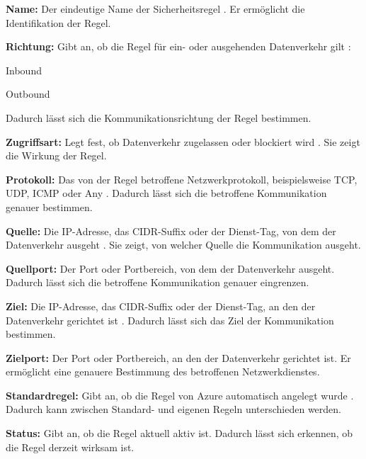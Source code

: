 \begin{compactitem}

    \item \textbf{Name:} Der eindeutige Name der Sicherheitsregel
    \cite{microsoft2026nsg}. Er ermöglicht die Identifikation der Regel.

    \item \textbf{Richtung:} Gibt an, ob die Regel für ein- oder ausgehenden
    Datenverkehr gilt \cite{microsoft2026nsg}:
    \begin{compactitem}
        \item Inbound
        \item Outbound
    \end{compactitem}
    Dadurch lässt sich die Kommunikationsrichtung der Regel bestimmen.

    \item \textbf{Zugriffsart:} Legt fest, ob Datenverkehr zugelassen oder
    blockiert wird \cite{microsoft2026nsg}. Sie zeigt die Wirkung der Regel.

    \item \textbf{Protokoll:} Das von der Regel betroffene Netzwerkprotokoll,
    beispielsweise TCP, UDP, ICMP oder Any \cite{microsoft2026nsg}.
    Dadurch lässt sich die betroffene Kommunikation genauer bestimmen.

    \item \textbf{Quelle:} Die IP-Adresse, das CIDR-Suffix oder der Dienst-Tag,
    von dem der Datenverkehr ausgeht \cite{microsoft2026nsg}.
    Sie zeigt, von welcher Quelle die Kommunikation ausgeht.

    \item \textbf{Quellport:} Der Port oder Portbereich, von dem der
    Datenverkehr ausgeht. Dadurch lässt sich die betroffene Kommunikation
    genauer eingrenzen.

    \item \textbf{Ziel:} Die IP-Adresse, das CIDR-Suffix oder der Dienst-Tag,
    an den der Datenverkehr gerichtet ist \cite{microsoft2026nsg}.
    Dadurch lässt sich das Ziel der Kommunikation bestimmen.

    \item \textbf{Zielport:} Der Port oder Portbereich, an den der
    Datenverkehr gerichtet ist. Er ermöglicht eine genauere Bestimmung
    des betroffenen Netzwerkdienstes.

    \item \textbf{Standardregel:} Gibt an, ob die Regel von Azure automatisch
    angelegt wurde \cite{microsoft2026nsg}. Dadurch kann zwischen
    Standard- und eigenen Regeln unterschieden werden.

    \item \textbf{Status:} Gibt an, ob die Regel aktuell aktiv ist.
    Dadurch lässt sich erkennen, ob die Regel derzeit wirksam ist.

\end{compactitem}

